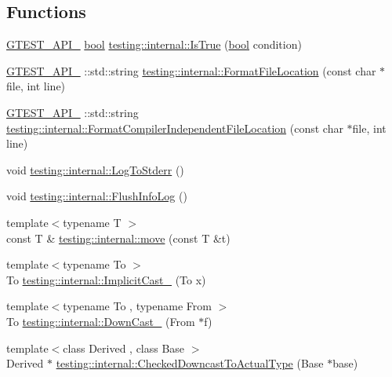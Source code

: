 \subsection*{Functions}
\begin{DoxyCompactItemize}
\item 
\hyperlink{gtest-port_8h_aa73be6f0ba4a7456180a94904ce17790}{G\+T\+E\+S\+T\+\_\+\+A\+P\+I\+\_\+} \hyperlink{classbool}{bool} \hyperlink{namespacetesting_1_1internal_a527b9bcc13669b9a16400c8514266254}{testing\+::internal\+::\+Is\+True} (\hyperlink{classbool}{bool} condition)
\item 
\hyperlink{gtest-port_8h_aa73be6f0ba4a7456180a94904ce17790}{G\+T\+E\+S\+T\+\_\+\+A\+P\+I\+\_\+} \+::std\+::string \hyperlink{namespacetesting_1_1internal_a31b7c3abed4a7c395f42c61e993989f4}{testing\+::internal\+::\+Format\+File\+Location} (const char $\ast$file, int line)
\item 
\hyperlink{gtest-port_8h_aa73be6f0ba4a7456180a94904ce17790}{G\+T\+E\+S\+T\+\_\+\+A\+P\+I\+\_\+} \+::std\+::string \hyperlink{namespacetesting_1_1internal_a1ee4cde97868c53e442d3182496a9f3c}{testing\+::internal\+::\+Format\+Compiler\+Independent\+File\+Location} (const char $\ast$file, int line)
\item 
void \hyperlink{namespacetesting_1_1internal_a06b1b20029fbd1dbeb59752f914fab84}{testing\+::internal\+::\+Log\+To\+Stderr} ()
\item 
void \hyperlink{namespacetesting_1_1internal_a2135f223bf6b527729aeaa651115183b}{testing\+::internal\+::\+Flush\+Info\+Log} ()
\item 
{\footnotesize template$<$typename T $>$ }\\const T \& \hyperlink{namespacetesting_1_1internal_a0f6d06bf8c3093b9c22bb08723db201e}{testing\+::internal\+::move} (const T \&t)
\item 
{\footnotesize template$<$typename To $>$ }\\To \hyperlink{namespacetesting_1_1internal_a982df3f369643b175f79cda4048bc3b9}{testing\+::internal\+::\+Implicit\+Cast\+\_\+} (To x)
\item 
{\footnotesize template$<$typename To , typename From $>$ }\\To \hyperlink{namespacetesting_1_1internal_a1a1a1aed3fe00908b8a45d5ab4a33665}{testing\+::internal\+::\+Down\+Cast\+\_\+} (From $\ast$f)
\item 
{\footnotesize template$<$class Derived , class Base $>$ }\\Derived $\ast$ \hyperlink{namespacetesting_1_1internal_abfe9bfb020d38aa4e0e12c001911b22b}{testing\+::internal\+::\+Checked\+Downcast\+To\+Actual\+Type} (Base $\ast$base)

\end{DoxyCompactItemize}
